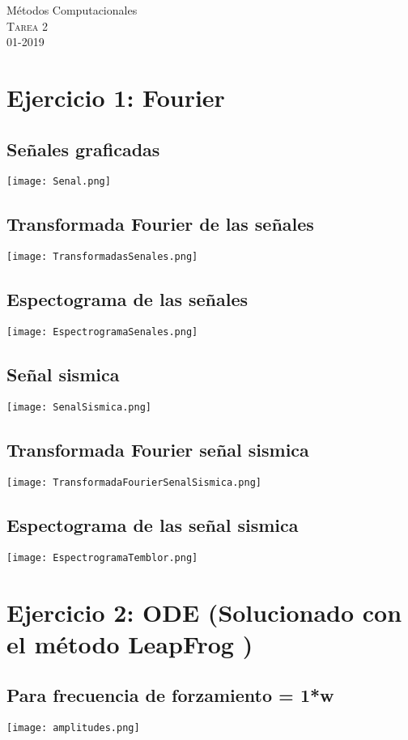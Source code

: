 \documentclass[11pt,letterpaper]{exam}
\begin{document}
\begin{center}
{\Large Métodos Computacionales} \\
\textsc{Tarea 2}\\
01-2019\\
\end{center}

\noindent

\section{Ejercicio 1: Fourier}

\subsection{ Señales graficadas}
\texttt{[image: Senal.png]}

\subsection{ Transformada Fourier de las señales}
\texttt{[image: TransformadasSenales.png]}

\subsection{ Espectograma de las señales}
\texttt{[image: EspectrogramaSenales.png]}

\subsection{ Señal sismica}
\texttt{[image: SenalSismica.png]}

\subsection{ Transformada Fourier señal sismica}
\texttt{[image: TransformadaFourierSenalSismica.png]}

\subsection{ Espectograma de las señal sismica}
\texttt{[image: EspectrogramaTemblor.png]}


\section{Ejercicio 2: ODE (Solucionado con el método LeapFrog )}

\subsection{ Para frecuencia de forzamiento = 1*w}
\texttt{[image: amplitudes.png]}
\end{document}
